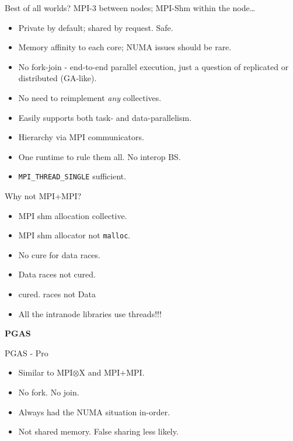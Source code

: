 \documentclass[11pt]{beamer}
\begin{document}
\begin{frame}{Best of all worlds?}
    MPI-3 between nodes; MPI-Shm within the node\ldots
    \begin{itemize}
        \item Private by default; shared by request.  Safe.
        \item Memory affinity to each core; NUMA issues should be rare.
        \item No fork-join - end-to-end parallel execution, 
              just a question of replicated or distributed (GA-like).
        \item No need to reimplement \textit{any} collectives.
        \item Easily supports both task- and data-parallelism.
        \item Hierarchy via MPI communicators.
        \item One runtime to rule them all.  No interop BS.
        \item \texttt{MPI\_THREAD\_SINGLE} sufficient.
    \end{itemize}
\end{frame}

\begin{frame}{Why not MPI+MPI?} \Large
    \begin{itemize}
        \item MPI shm allocation collective.
        \item MPI shm allocator not \texttt{malloc}.
        \item No cure for data races.
        \item Data races not cured.
        \item cured. races not Data
        \item All the intranode libraries use threads!!!
    \end{itemize}
\end{frame}

\begin{frame}{} \LARGE
  \begin{center}
      \textbf{PGAS}
  \end{center}
\end{frame}

\begin{frame}{PGAS - Pro} \Large
    \begin{itemize}
        \item Similar to MPI$\otimes$X and MPI+MPI.
        \item No fork.  No join.
        \item Always had the NUMA situation in-order.
        \item Not shared memory.  False sharing less likely.
    \end{itemize}
\end{frame}
\end{document}
